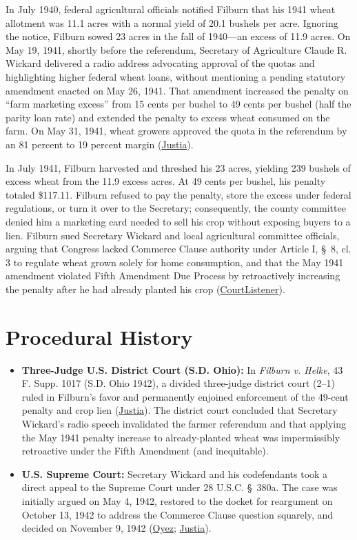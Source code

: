 \documentclass[12pt]{article}
\begin{document}
In July 1940, federal agricultural officials notified Filburn that his 1941 wheat allotment was 11.1 acres with a normal yield of 20.1 bushels per acre. Ignoring the notice, Filburn sowed 23 acres in the fall of 1940---an excess of 11.9 acres. On May 19, 1941, shortly before the referendum, Secretary of Agriculture Claude R. Wickard delivered a radio address advocating approval of the quotas and highlighting higher federal wheat loans, without mentioning a pending statutory amendment enacted on May 26, 1941. That amendment increased the penalty on ``farm marketing excess'' from 15 cents per bushel to 49 cents per bushel (half the parity loan rate) and extended the penalty to excess wheat consumed on the farm. On May 31, 1941, wheat growers approved the quota in the referendum by an 81 percent to 19 percent margin (\href{https://supreme.justia.com/cases/federal/us/317/111/}{Justia}).

In July 1941, Filburn harvested and threshed his 23 acres, yielding 239 bushels of excess wheat from the 11.9 excess acres. At 49 cents per bushel, his penalty totaled \$117.11. Filburn refused to pay the penalty, store the excess under federal regulations, or turn it over to the Secretary; consequently, the county committee denied him a marketing card needed to sell his crop without exposing buyers to a lien. Filburn sued Secretary Wickard and local agricultural committee officials, arguing that Congress lacked Commerce Clause authority under Article I, \S~8, cl. 3 to regulate wheat grown solely for home consumption, and that the May 1941 amendment violated Fifth Amendment Due Process by retroactively increasing the penalty after he had already planted his crop (\href{https://www.courtlistener.com/opinion/103716/wickard-v-filburn/}{CourtListener}).

\section{Procedural History}

\begin{itemize}
    \item \textbf{Three-Judge U.S. District Court (S.D. Ohio):} In \textit{Filburn v. Helke}, 43 F. Supp. 1017 (S.D. Ohio 1942), a divided three-judge district court (2--1) ruled in Filburn's favor and permanently enjoined enforcement of the 49-cent penalty and crop lien (\href{https://supreme.justia.com/cases/federal/us/317/111/}{Justia}). The district court concluded that Secretary Wickard's radio speech invalidated the farmer referendum and that applying the May 1941 penalty increase to already-planted wheat was impermissibly retroactive under the Fifth Amendment (and inequitable).
    \item \textbf{U.S. Supreme Court:} Secretary Wickard and his codefendants took a direct appeal to the Supreme Court under 28 U.S.C. \S~380a. The case was initially argued on May 4, 1942, restored to the docket for reargument on October 13, 1942 to address the Commerce Clause question squarely, and decided on November 9, 1942 (\href{https://www.oyez.org/cases/1940-1955/317us111}{Oyez}; \href{https://supreme.justia.com/cases/federal/us/317/111/}{Justia}).
\end{itemize}
\end{document}
